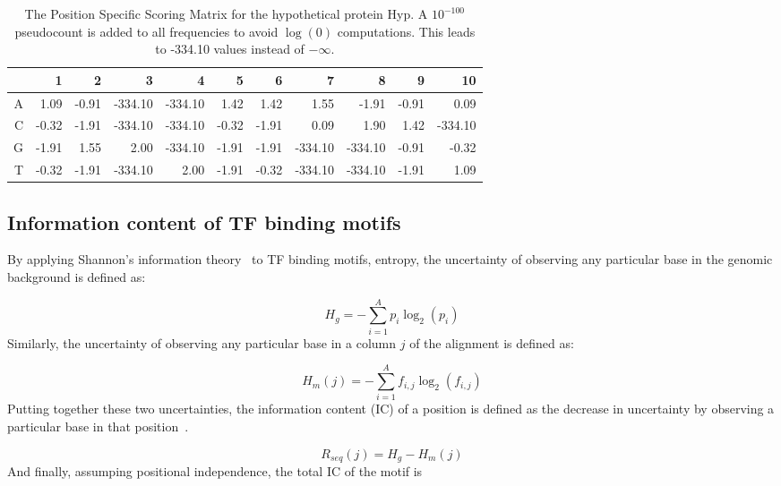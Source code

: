 \begin{table}
  \centering
  \caption[The Position Specific Scoring Matrix for the hypothetical
  protein.]{The Position Specific Scoring Matrix for the hypothetical protein
    Hyp. A $10^{-100}$ pseudocount is added to all frequencies to avoid
    $\log(0)$ computations. This leads to -334.10 values
    instead of $-\infty$.}
  \label{tab:pssm}
  \begin{tabular}{|r|r|r|r|r|r|r|r|r|r|r|}
\hline
  &     1 &   2 &    3 &    4 &    5 &    6 &    7 &    8 &    9 & 10\\
\hline
A &  1.09 & -0.91 & -334.10 & -334.10 &  1.42 &  1.42 &  1.55   & -1.91 & -0.91&   0.09\\
\hline
C & -0.32 & -1.91 & -334.10 & -334.10 & -0.32 & -1.91 &  0.09   & 1.90  & 1.42 & -334.10\\
\hline
G & -1.91 &  1.55 &  2.00   & -334.10 & -1.91 & -1.91 & -334.10 & -334.10 &  -0.91 & -0.32\\
\hline
T & -0.32 & -1.91 & -334.10 &  2.00   & -1.91 & -0.32 & -334.10 & -334.10 &  -1.91 &  1.09\\
\hline
  \end{tabular}
\end{table}

\subsection{Information content of TF binding motifs}

By applying Shannon’s information theory~\citep{shannon1948mathematical} to TF
binding motifs, entropy, the uncertainty of observing any particular base in
the genomic background is defined as:

\begin{equation}
  \label{eq:hg}
  H_g = -\displaystyle\sum_{i=1}^A p_i \log_2(p_i)
\end{equation}
Similarly, the uncertainty of observing any particular base in a column $j$ of
the alignment is defined as:

\begin{equation}
  \label{eq:hm}
  H_m(j) = -\displaystyle\sum_{i=1}^A f_{i, j} \log_2(f_{i, j})
\end{equation}
Putting together these two uncertainties, the information content (IC) of a
position is defined as the decrease in uncertainty by observing a particular
base in that position~\citep{schneider1986information}.

\begin{equation}
  \label{eq:rseq}
  R_{seq}(j) = H_g - H_m(j)
\end{equation}
And finally, assumping positional independence, the total IC of the motif is

